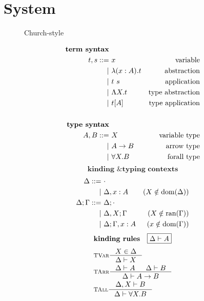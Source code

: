 \section{System \F} \label{sec:f}
\begin{figure}
\begin{singlespace}
\begin{minipage}{.46\textwidth}
	\begin{center}Church-style\end{center}
\def\baselinestretch{0}
\small
\begin{align*}
\textbf{term syntax} \\
t,s ::= &~ x           & \text{variable}    \\
      | &~ \lambda(x:A) . t & \text{abstraction} \\
      | &~ t ~ s       & \text{application} \\
      | &~ \Lambda X    . t & \text{type abstraction} \\
      | &~ t [A]       & \text{type application} \\
\\
\textbf{type syntax} \\
A,B ::= &~ X           & \text{variable type}   \\
      | &~ A -> B      & \text{arrow type} \\
      | &~ \forall X.B & \text{forall type}   \\
\end{align*}
\[ \textbf{kinding \& typing contexts} \]\vspace*{-1em}
\begin{align*}\quad
\Delta ::= &~ \cdot \\
	 | &~ \Delta, x:A & (X\notin \mathop{\textrm{dom}}(\Delta)) \\
\Delta;\Gamma ::= &~ \Delta;\cdot \\
	        | &~ \Delta,X;\Gamma    & (X\notin \mathop{\textrm{ran}}(\Gamma)) \\
	        | &~ \Delta;\Gamma, x:A & (x\notin \mathop{\textrm{dom}}(\Gamma)) \\
\end{align*}
\[ \textbf{kinding rules} \quad \framebox{$ \Delta |- A $} \]\vspace*{-1em}
\begin{align*}
& \inference[\sc TVar]{X \in \Delta}{\Delta |- X} \\
& \inference[\sc TArr]{\Delta |- A & \Delta |- B}{\Delta |- A -> B} \\
& \inference[\sc TAll]{\Delta,X |- B}{\Delta |- \forall X.B} \\

\end{align*}
\end{minipage}
\end{singlespace}
\end{figure}
